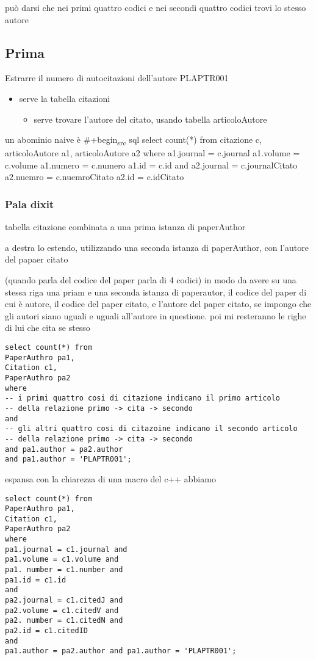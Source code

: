 \documentclass[11pt]{article}
\begin{document}
può darsi che nei primi quattro codici e nei secondi quattro codici trovi lo stesso autore

\subsection{Prima}
\label{sec:org13f04a9}
Estrarre il numero di autocitazioni dell'autore PLAPTR001

\begin{itemize}
\item serve la tabella citazioni
\begin{itemize}
\item serve trovare l'autore del citato, usando tabella articoloAutore
\end{itemize}
\end{itemize}

un abominio naive è
\#+begin\textsubscript{src} sql
      select count(*)
    from citazione c, articoloAutore a1, articoloAutore a2
    where
  a1.journal = c.journal
  a1.volume = c.volume
  a1.numero = c.numero
  a1.id = c.id
  and
  a2.journal = c.journalCitato 
  a2.nuemro = c.nuemroCitato 
  a2.id = c.idCitato 

\subsubsection{Pala dixit}
\label{sec:org12999ce}
tabella citazione combinata a una prima istanza di paperAuthor

a destra lo estendo, utilizzando una seconda istanza di paperAuthor, con l'autore del
papaer citato

(quando parla del codice del paper parla di 4 codici)
in modo da avere su una stessa riga una priam e una seconda istanza di paperautor, il
codice del paper di cui è autore, il codice del paper citato, e l'autore del paper citato,
se impongo che gli autori siano uguali e uguali all'autore in questione.
poi mi resteranno le righe di lui che cita se stesso

\begin{verbatim}
select count(*) from
PaperAuthro pa1,
Citation c1,
PaperAuthro pa2
where
-- i primi quattro cosi di citazione indicano il primo articolo
-- della relazione primo -> cita -> secondo
and
-- gli altri quattro cosi di citazoine indicano il secondo articolo
-- della relazione primo -> cita -> secondo
and pa1.author = pa2.author
and pa1.author = 'PLAPTR001';
\end{verbatim}

espansa con la chiarezza di una macro del c++ abbiamo
\begin{verbatim}
select count(*) from
PaperAuthro pa1,
Citation c1,
PaperAuthro pa2
where
pa1.journal = c1.journal and
pa1.volume = c1.volume and
pa1. number = c1.number and
pa1.id = c1.id
and
pa2.journal = c1.citedJ and
pa2.volume = c1.citedV and
pa2. number = c1.citedN and
pa2.id = c1.citedID
and
pa1.author = pa2.author and pa1.author = 'PLAPTR001';
\end{verbatim}
\end{document}
